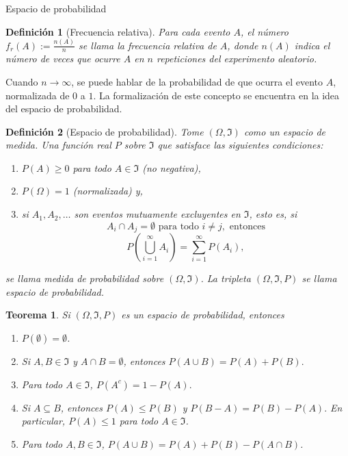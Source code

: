 \documentclass{beamer}
\newtheorem{defi}{Definición}[section]
\newtheorem{theo}{Teorema}[section]
\begin{document}
	\begin{frame}[allowframebreaks]{Espacio de probabilidad}
		\begin{defi}[Frecuencia relativa]
		Para cada evento $A$, el número $f_r(A):=\frac{n(A)}{n}$ se llama la frecuencia relativa de $A$, donde $n(A)$ indica el número de veces que ocurre $A$ en $n$ repeticiones del experimento aleatorio.
	\end{defi}
	Cuando $n\rightarrow\infty$, se puede hablar de la probabilidad de que ocurra el evento $A$, normalizada de $0$ a $1$. La formalización de este concepto se encuentra en la idea del espacio de probabilidad.
	
	\begin{defi}[Espacio de probabilidad]
		Tome $(\Omega,\Im)$ como un espacio de medida. Una función real $P$ sobre $\Im$ que satisface las siguientes condiciones:
		\begin{enumerate}
			\item $P(A)\geq0$ para todo $A\in\Im$ (no negativa),
			\item $P(\Omega)=1$ (normalizada) y,
			\item si $A_1,A_2,\dots$ son eventos mutuamente excluyentes en $\Im$, esto es, si
			$$A_i\cap A_j=\emptyset \text{ para todo }i\neq j, \text{ entonces}$$
			$$P\left(\bigcup_{i=1}^\infty A_i\right)=\sum_{i=1}^\infty P(A_i),$$
		\end{enumerate}
		se llama medida de probabilidad sobre $(\Omega,\Im)$. La tripleta $(\Omega,\Im,P)$ se llama espacio de probabilidad.
	\end{defi}
	\begin{theo}
		Si $(\Omega,\Im,P)$ es un espacio de probabilidad, entonces
		\begin{enumerate}
			\item $P(\emptyset)=\emptyset$.
			\item Si $A,B\in\Im$ y $A\cap B=\emptyset$, entonces $P(A\cup B)=P(A)+P(B).$
			\item Para todo $A\in\Im$, $P(A^c)=1-P(A).$
			\item Si $A\subseteq B$, entonces $P(A)\leq P(B)$ y $P(B-A)=P(B)-P(A).$ En particular, $P(A)\leq1$ para todo $A\in\Im$.
			\item Para todo $A,B\in\Im$, $P(A\cup B)=P(A)+P(B)-P(A\cap B)$.
			

\end{enumerate}
\end{theo}
\end{frame}
\end{document}
